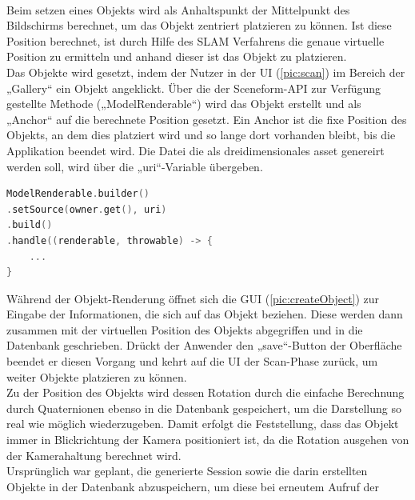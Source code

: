 \\ 
Beim setzen eines Objekts wird als Anhaltspunkt der Mittelpunkt des Bildschirms berechnet, um das Objekt zentriert platzieren zu können. Ist 
diese Position berechnet, ist durch Hilfe des \acs{SLAM} Verfahrens die genaue virtuelle Position zu ermitteln und anhand dieser ist das Objekt 
zu platzieren. 
\\ 
Das Objekte wird gesetzt, indem der Nutzer in der \acs{UI} (\ref{pic:scan}) im Bereich der „Gallery“ ein Objekt angeklickt.
Über die der Sceneform-\acs{API} zur Verfügung gestellte Methode („ModelRenderable“) wird das Objekt erstellt und als „Anchor“ auf die berechnete Position 
gesetzt. Ein Anchor ist die fixe Position des Objekts, an dem dies platziert wird und so lange dort vorhanden bleibt, bis die Applikation beendet wird. Die Datei 
die als dreidimensionales asset genereirt werden soll, wird über die „uri“-Variable übergeben. 
\begin{lstlisting}[language=C,
    frame=lines,           % Ein Rahmen um den Code (single for box, lines for top and bottom)
    xleftmargin=\parindent,  % Rahmen link von den Zahlen
    style=algoBericht,
    label={code:modelrenderable},
    captionpos=b,           % Caption unter den Code setzen
caption={ModelRenderable Builder}]
ModelRenderable.builder()
.setSource(owner.get(), uri)
.build()
.handle((renderable, throwable) -> {
    ...
}
\end{lstlisting}
Während der Objekt-Renderung öffnet sich die \acs{GUI} (\ref{pic:createObject}) zur Eingabe der Informationen, die sich auf das Objekt beziehen. Diese 
werden dann zusammen mit der virtuellen Position des Objekts abgegriffen und in die Datenbank geschrieben. Drückt der Anwender den „save“-Button der Oberfläche 
beendet er diesen Vorgang und kehrt auf die \acs{UI} der Scan-Phase zurück, um weiter Objekte platzieren zu können. 
\\ 
Zu der Position des Objekts wird dessen Rotation durch die einfache Berechnung durch Quaternionen ebenso in die Datenbank gespeichert, um die Darstellung so real 
wie möglich wiederzugeben. Damit erfolgt die Feststellung, dass das Objekt immer in Blickrichtung der Kamera positioniert ist, da die Rotation ausgehen von der 
Kamerahaltung berechnet wird. 
\\ 
\linebreak
Ursprünglich war geplant, die generierte Session sowie die darin erstellten Objekte in der Datenbank abzuspeichern, um diese bei erneutem Aufruf der 
